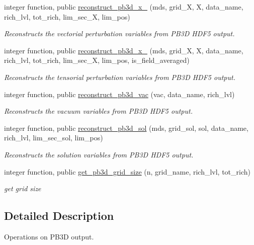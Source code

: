 \begin{DoxyCompactItemize}
integer function, public \hyperlink{namespacepb3d__ops_a8e87e553956f0dc4371d85b008e5e131}{reconstruct\+\_\+pb3d\+\_\+x\+\_} (mds, grid\+\_\+X, X, data\+\_\+name, rich\+\_\+lvl, tot\+\_\+rich, lim\+\_\+sec\+\_\+X, lim\+\_\+pos)
\begin{DoxyCompactList}\small\item\em Reconstructs the vectorial perturbation variables from P\+B3D H\+D\+F5 output. \end{DoxyCompactList}\item 
integer function, public \hyperlink{namespacepb3d__ops_aff64b6722845a07139e2832c0be36145}{reconstruct\+\_\+pb3d\+\_\+x\+\_} (mds, grid\+\_\+X, X, data\+\_\+name, rich\+\_\+lvl, tot\+\_\+rich, lim\+\_\+sec\+\_\+X, lim\+\_\+pos, is\+\_\+field\+\_\+averaged)
\begin{DoxyCompactList}\small\item\em Reconstructs the tensorial perturbation variables from P\+B3D H\+D\+F5 output. \end{DoxyCompactList}\item 
integer function, public \hyperlink{namespacepb3d__ops_a281c496a42c4ea46606e929e10d51582}{reconstruct\+\_\+pb3d\+\_\+vac} (vac, data\+\_\+name, rich\+\_\+lvl)
\begin{DoxyCompactList}\small\item\em Reconstructs the vacuum variables from P\+B3D H\+D\+F5 output. \end{DoxyCompactList}\item 
integer function, public \hyperlink{namespacepb3d__ops_ae7afc544227f34f2877eb5a14d620823}{reconstruct\+\_\+pb3d\+\_\+sol} (mds, grid\+\_\+sol, sol, data\+\_\+name, rich\+\_\+lvl, lim\+\_\+sec\+\_\+sol, lim\+\_\+pos)
\begin{DoxyCompactList}\small\item\em Reconstructs the solution variables from P\+B3D H\+D\+F5 output. \end{DoxyCompactList}\item 
integer function, public \hyperlink{namespacepb3d__ops_a528ae2857b7272d29d96f66ee60980a7}{get\+\_\+pb3d\+\_\+grid\+\_\+size} (n, grid\+\_\+name, rich\+\_\+lvl, tot\+\_\+rich)
\begin{DoxyCompactList}\small\item\em get grid size \end{DoxyCompactList}\end{DoxyCompactItemize}


\subsection{Detailed Description}
Operations on P\+B3D output. 

